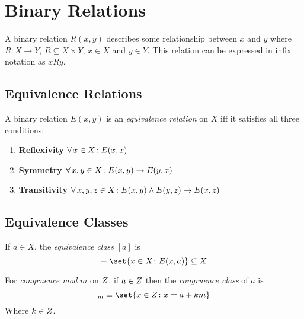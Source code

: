 \section{Binary Relations}

\begin{definition}
	A binary relation $R(x, y)$ describes some relationship between $x$ and $y$ where $R \colon X \to Y$, $R \subseteq X \times Y$, $x \in X$ and $y \in Y$. This relation can be expressed in infix notation as $xRy$.
\end{definition}

\subsection{Equivalence Relations}
\begin{definition}
	A binary relation $E(x, y)$ is an \textit{equivalence relation} on $X$ iff it satisfies all three conditions:
    \begin{enumerate}
        \item \textbf{Reflexivity}
            \subitem $\operatorname{\forall} x \in X \colon E(x, x)$
        \item \textbf{Symmetry}
            \subitem $\operatorname{\forall} x, y \in X \colon E(x, y) \to E(y, x)$
        \item \textbf{Transitivity}
            \subitem $\operatorname{\forall} x, y, z \in X \colon E(x, y) \land E(y, z) \to E(x, z)$
    \end{enumerate}
\end{definition}

\subsection{Equivalence Classes}
\begin{definition}
    If $a \in X$, the \textit{equivalence class} $[a]$ is
    \begin{equation}
        [a] \equiv \set{x \in X \colon E(x, a)} \subseteq X
    \end{equation}
\end{definition}

\begin{definition}
    For \textit{congruence mod} $m$ on $\relax{Z}$, if $a \in \relax{Z}$ then the \textit{congruence class} of $a$ is
    \begin{equation}
        [a]_m \equiv \set{x \in \Int \colon x = a + km}
    \end{equation}
    Where $k \in \relax{Z}$.
\end{definition}